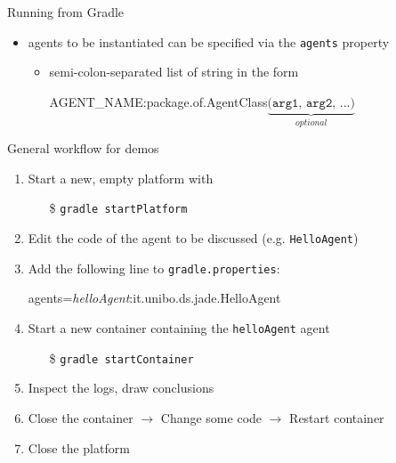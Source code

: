 \documentclass{beamer}\mode<presentation>{\usetheme{AMSCesenaPurpleAndGold}}
\begin{document}
\begin{frame}{Running \jade{} from Gradle}
\begin{itemize}
\begin{itemize}
    		\item agents to be instantiated can be specified via the \alert{\texttt{agents}} property
    		\begin{itemize}
    			\item semi-colon-separated list of string in the form
    			\begin{center}\ttfamily
    				AGENT\_NAME\alert{:}package.of.AgentClass$\underbrace{\texttt{(arg1, arg2, \ldots)}}_{optional}$
    			\end{center}
    		\end{itemize}
	    \end{itemize}
    \end{itemize}
\end{frame}

\begin{frame}{General workflow for demos}

	\begin{enumerate}
		\item Start a new, empty platform with
		\begin{itemize}
			\item[\$] \texttt{gradle startPlatform}
		\end{itemize}

		\vfill

		\item Edit the code of the agent to be discussed (e.g. \texttt{HelloAgent})

		\vfill

		\item Add the following line to \texttt{gradle.properties}:
		\begin{center}\ttfamily
			\alert{agents}=\textit{helloAgent}:it.unibo.ds.jade.HelloAgent
		\end{center}

		\vfill

		\item Start a new container containing the \texttt{helloAgent} agent
		\begin{itemize}
			\item[\$] \texttt{gradle startContainer}
		\end{itemize}

		\vfill

		\item Inspect the logs, draw conclusions

		\vfill

		\item Close the container $\rightarrow$ Change some code $\rightarrow$ Restart container

		\vfill

		\item Close the platform

	\end{enumerate}

 \end{frame}
\end{document}
